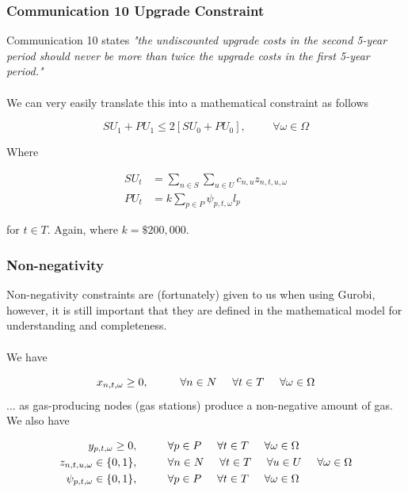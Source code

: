 \documentclass{article}
\begin{document}
\bigskip
\subsubsection{Communication 10 Upgrade Constraint}
Communication 10 states \textit{"the undiscounted upgrade costs in the second 5-year period should never be more than twice the upgrade costs in the first 5-year period."}\\
\\
We can very easily translate this into a mathematical constraint as follows

\[{SU}_{1} + {PU}_{1} \leq 2 \left[{SU}_{0} + {PU}_{0}\right], \hspace{1cm} \forall \omega \in \Omega\]

\noindent
Where

\begin{align}
    {SU}_{t} &= \sum_{n \in S}\sum_{u \in U} c_{n,u} z_{n,t,u,\omega} \\
    {PU}_{t} &= k \sum_{p \in P}  \psi_{p,t,\omega} l_{p}
\end{align}

\noindent
for \(t \in T\). Again, where \(k = \$ 200,000\).

\noindent

\bigskip

\subsubsection{Non-negativity}
\bigskip
Non-negativity constraints are (fortunately) given to us when using Gurobi, however, it is still important that they are defined in the mathematical model for understanding and completeness.\\
\\
We have

\[x_{n,t,\omega} \geq 0, \hspace{1cm} \forall n \in N \hspace{0.5cm} \forall t \in T \hspace{0.5cm} \forall \omega \in \Omega\]
... as gas-producing nodes (gas stations) produce a non-negative amount of gas.
We also have

\begin{align*}
    y_{p,t,\omega} \geq 0,& \hspace{1cm} \forall p \in P \hspace{0.5cm} \forall t \in T \hspace{0.5cm} \forall \omega \in \Omega \\
    z_{n,t,u,\omega} \in \{0,1\},& \hspace{1cm} \forall n \in N \hspace{0.5cm} \forall t \in T \hspace{0.5cm} \forall u \in U \hspace{0.5cm} \forall \omega \in \Omega \\
    \psi_{p,t,\omega} \in \{0,1\},& \hspace{1cm} \forall p \in P \hspace{0.5cm} \forall t \in T \hspace{0.5cm} \forall \omega \in \Omega
\end{align*}
\end{document}
